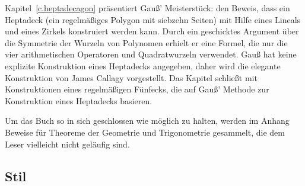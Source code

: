 Kapitel~\ref{c.heptadecagon} präsentiert Gauß' Meisterstück: den Beweis, dass ein Heptadeck (ein regelmäßiges Polygon mit siebzehn Seiten) mit Hilfe eines Lineals und eines Zirkels konstruiert werden kann. Durch ein geschicktes Argument über die Symmetrie der Wurzeln von Polynomen erhielt er eine Formel, die nur die vier arithmetischen Operatoren und Quadratwurzeln verwendet. Gauß hat keine explizite Konstruktion eines Heptadecks angegeben, daher wird die elegante Konstruktion von James Callagy vorgestellt. Das Kapitel schließt mit Konstruktionen eines regelmäßigen Fünfecks, die auf Gauß' Methode zur Konstruktion eines Heptadecks basieren.

Um das Buch so in sich geschlossen wie möglich zu halten, werden im Anhang Beweise für Theoreme der Geometrie und Trigonometrie gesammelt, die dem Leser vielleicht nicht geläufig sind.

\subsection*{Stil}

